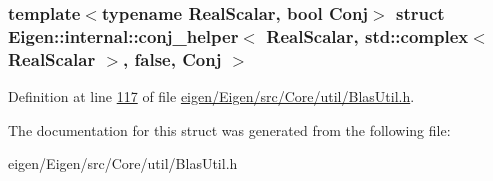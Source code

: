 \subsubsection*{template$<$typename Real\+Scalar, bool Conj$>$\newline
struct Eigen\+::internal\+::conj\+\_\+helper$<$ Real\+Scalar, std\+::complex$<$ Real\+Scalar $>$, false, Conj $>$}



Definition at line \hyperlink{eigen_2_eigen_2src_2_core_2util_2_blas_util_8h_source_l00117}{117} of file \hyperlink{eigen_2_eigen_2src_2_core_2util_2_blas_util_8h_source}{eigen/\+Eigen/src/\+Core/util/\+Blas\+Util.\+h}.



The documentation for this struct was generated from the following file\+:\begin{DoxyCompactItemize}
\item 
eigen/\+Eigen/src/\+Core/util/\+Blas\+Util.\+h\end{DoxyCompactItemize}
